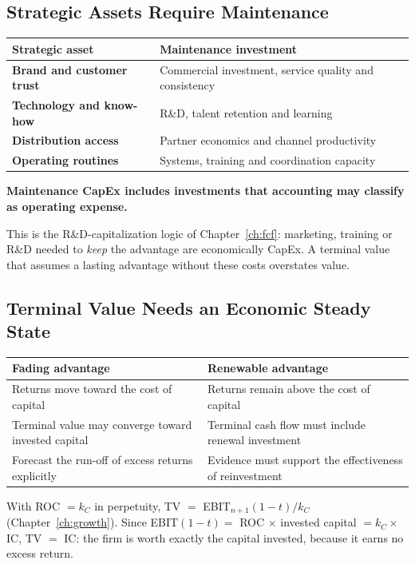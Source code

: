 \subsection{Strategic Assets Require Maintenance}
\begin{center}
\small
\begin{tabular}{@{}>{\bfseries}p{4.5cm}p{9.5cm}@{}}
\toprule
\textnormal{\textbf{Strategic asset}} & \textbf{Maintenance investment}\\
\midrule
Brand and customer trust & Commercial investment, service quality and consistency\\
Technology and know-how & R\&D, talent retention and learning\\
Distribution access & Partner economics and channel productivity\\
Operating routines & Systems, training and coordination capacity\\
\bottomrule
\end{tabular}
\end{center}
\begin{keybox}
\textbf{Maintenance CapEx includes investments that accounting may classify as operating expense.}
\end{keybox}
\begin{addbox}
This is the R\&D-capitalization logic of Chapter~\ref{ch:fcf}: marketing, training or R\&D needed to \emph{keep} the advantage are economically CapEx. A terminal value that assumes a lasting advantage without these costs overstates value.
\end{addbox}

\subsection{Terminal Value Needs an Economic Steady State}
\begin{center}
\small
\begin{tabular}{@{}p{7cm}p{7cm}@{}}
\toprule
\textbf{Fading advantage} & \textbf{Renewable advantage}\\
\midrule
Returns move toward the cost of capital & Returns remain above the cost of capital\\
Terminal value may converge toward invested capital & Terminal cash flow must include renewal investment\\
Forecast the run-off of excess returns explicitly & Evidence must support the effectiveness of reinvestment\\
\bottomrule
\end{tabular}
\end{center}
\begin{addbox}
With ROC $=k_C$ in perpetuity, TV $=$ EBIT$_{n+1}(1-t)/k_C$ (Chapter~\ref{ch:growth}). Since EBIT$(1-t)=$ ROC $\times$ invested capital $=k_C\times$ IC, TV $=$ IC: the firm is worth exactly the capital invested, because it earns no excess return.
\end{addbox}

